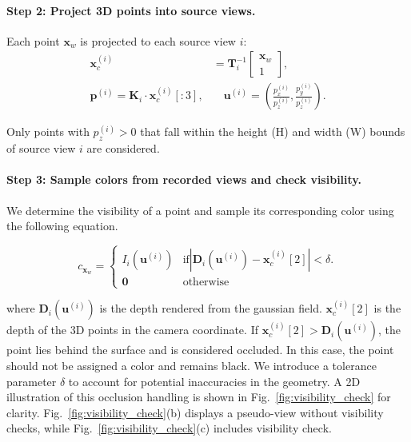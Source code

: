 \paragraph{Step 2: Project 3D points into source views.}

Each point $\mathbf{x}_w$ is projected to each source view $i$:
\begin{equation}
\label{eq:projection}
\begin{split}
    \mathbf{x}_c^{(i)} &= \mathbf{T}_i^{-1} \begin{bmatrix} \mathbf{x}_w \\ 1 \end{bmatrix}, \\
    \mathbf{p}^{(i)} = \mathbf{K}_i \cdot \mathbf{x}_c^{(i)}[:3], &\quad \mathbf{u}^{(i)} = \left( \frac{p_x^{(i)}}{p_z^{(i)}}, \frac{p_y^{(i)}}{p_z^{(i)}} \right).
\end{split}
\end{equation}


Only points with $p_z^{(i)} > 0$ that fall within the height (H) and width (W) bounds of source view $i$ are considered.

\vspace{-0.1in}
\paragraph{Step 3: Sample colors from recorded views and check visibility.}
We determine the visibility of a point and sample its corresponding color using the following equation. 

\vspace{-0.2in}
\begin{equation}
    c_{\mathbf{x}_w} = \begin{cases}I_i(\mathbf{u}^{(i)}) &  \mbox{if}  \left| \mathbf{D}_i(\mathbf{u}^{(i)}) - \mathbf{x}_c^{(i)}[2] \right| < \delta. \\
    \mathbf{0} & \mbox{otherwise} \end{cases}
    \label{eq:sample_color}
\end{equation}

where $\mathbf{D}_i(\mathbf{u}^{(i)})$ is the depth rendered from the gaussian field. $\mathbf{x}_c^{(i)}[2]$ is the depth of the 3D points in the camera coordinate. If  $\mathbf{x}_c^{(i)}[2] > \mathbf{D}_i(\mathbf{u}^{(i)})$, the point lies behind the surface and is considered occluded. In this case, the point should not be assigned a color and remains black. We introduce a tolerance parameter $\delta$ to account for potential inaccuracies in the geometry. A 2D illustration of this occlusion handling is shown in Fig.~\ref{fig:visibility_check} for clarity. Fig.~\ref{fig:visibility_check}(b) displays a pseudo-view without visibility checks, while Fig.~\ref{fig:visibility_check}(c) includes visibility check.


